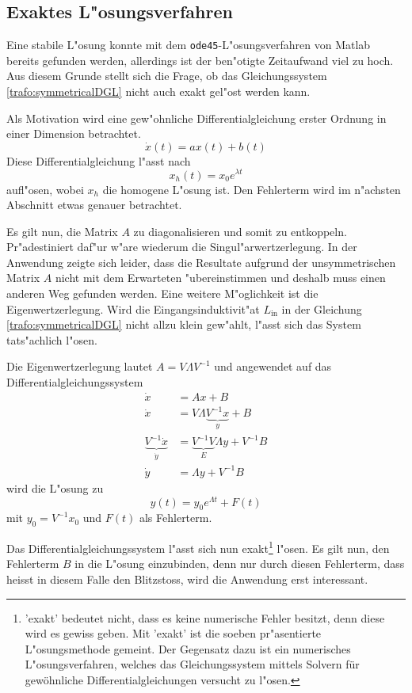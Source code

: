\begin{refsection}
\subsection{Exaktes L"osungsverfahren}
Eine stabile L"osung konnte mit dem \texttt{ode45}-L"osungsverfahren von Matlab bereits gefunden werden, allerdings ist der ben"otigte Zeitaufwand viel zu hoch. Aus diesem Grunde stellt sich die Frage, ob das Gleichungssystem \ref{trafo:symmetricalDGL} nicht auch exakt gel"ost werden kann.

Als Motivation wird eine gew"ohnliche Differentialgleichung erster Ordnung in einer Dimension betrachtet. 
\begin{equation*}
	\dot{x}(t) = a x(t) + b(t)
	\label{trafo:1D_DGL}
\end{equation*}
Diese Differentialgleichung l"asst nach
\begin{equation*}
	x_h(t) = x_0 e^{\lambda t}
	\label{trafo:homogene_Loesung}
\end{equation*}
aufl"osen, wobei $x_h$ die homogene L"osung ist. Den Fehlerterm wird im n"achsten Abschnitt etwas genauer betrachtet. 

Es gilt nun, die Matrix $A$ zu diagonalisieren und somit zu entkoppeln. Pr"adestiniert daf"ur w"are wiederum die Singul"arwertzerlegung. In der Anwendung zeigte sich leider, dass die Resultate aufgrund der unsymmetrischen Matrix $A$ nicht mit dem Erwarteten "ubereinstimmen und deshalb muss einen anderen Weg gefunden werden. Eine weitere M"oglichkeit ist die Eigenwertzerlegung. Wird die Eingangsinduktivit"at $L_\mathrm{in}$ in der Gleichung \ref{trafo:symmetricalDGL} nicht allzu klein gew"ahlt, l"asst sich das System tats"achlich l"osen.

Die Eigenwertzerlegung lautet $A = V\Lambda V^{-1}$ und angewendet auf das Differentialgleichungssystem 
\begin{align*}
	\dot{x} &= Ax + B \\
	\dot{x} &= V \Lambda \underbrace{V^{-1} x}_{y} + B \\
	\underbrace{V^{-1} \dot{x}}_{\dot{y}} &= \underbrace{V^{-1}V}_{E} \Lambda y + V^{-1} B \\
	\dot{y} &= \Lambda y + V^{-1} B
\end{align*}
wird die L"osung zu
\begin{equation}
	y(t) = y_0 e^{\Lambda t} + F(t)
	\label{trafo:TransfDGL}
\end{equation}
mit $y_0 = V^{-1}x_0$ und $F(t)$ als Fehlerterm.

Das Differentialgleichungssystem l"asst sich nun exakt\footnote{'exakt' bedeutet nicht, dass es keine numerische Fehler besitzt, denn diese wird es gewiss geben. Mit 'exakt' ist die soeben pr"asentierte L"osungsmethode gemeint. Der Gegensatz dazu ist ein numerisches L"osungsverfahren, welches das Gleichungssystem mittels Solvern für gewöhnliche Differentialgleichungen versucht zu l"osen.} l"osen. Es gilt nun, den Fehlerterm $B$ in die L"osung einzubinden, denn nur durch diesen Fehlerterm, dass heisst in diesem Falle den Blitzstoss, wird die Anwendung erst interessant.


\end{refsection}
